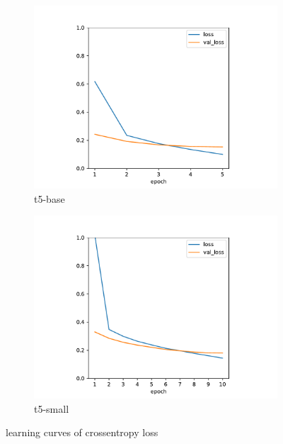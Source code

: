 \documentclass[11pt,a4paper,onecolumn,oneside,notitlepage]{article}
\begin{document}
\begin{figure}
     \centering
     \begin{subfigure}[b]{0.48\textwidth}
         \centering
         \includegraphics[width=\textwidth]{graphics/loss_base.pdf}
         \caption{t5-base}
         \label{fig:y equals x}
     \end{subfigure}
     \begin{subfigure}[b]{0.48\textwidth}
         \centering
         \includegraphics[width=\textwidth]{graphics/loss_small.pdf}
         \caption{t5-small}
         \label{fig:three sin x}
     \end{subfigure}
     \hfill
        \caption{learning curves of crossentropy loss}
        \label{fig:loss}
\end{figure}
\end{document}
